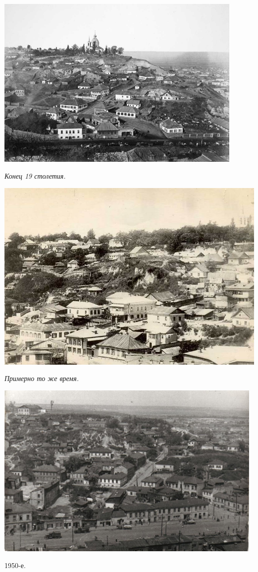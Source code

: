 \begin{center}
\includegraphics[width=0.90\textwidth]{chast-colebanie-osnov/sheka/sheka-19st-02.jpg}

\textit{Конец 19 столетия.}
\end{center}


\begin{center}
\includegraphics[width=0.90\linewidth]{chast-colebanie-osnov/sheka/sheka-19st-01.jpg}

\textit{Примерно то же время.}
\end{center}

\newpage


\begin{center}
\includegraphics[width=0.98\textwidth]{chast-colebanie-osnov/sheka/sheka50.jpg}

1950-е.
\end{center}

